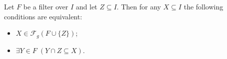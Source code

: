 Let $F$ be a filter over $I$ and let $Z \subseteq I$. Then for any $X \subseteq I$ the following conditions are equivalent:
\begin{itemize}
\item[(i)] $X \in \mathcal{F}_g(F \cup \{Z\})$;
\item[(ii)] $\exists Y \in F \; (Y \cap Z \subseteq X)$.
\end{itemize}
